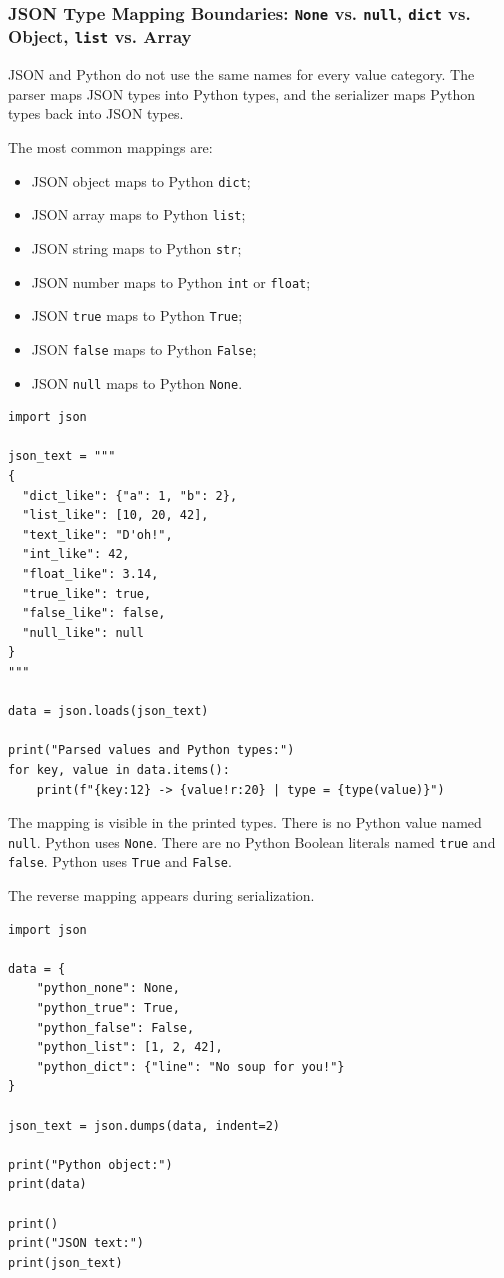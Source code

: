 \subsubsection{JSON Type Mapping Boundaries: \texttt{None} vs. \texttt{null}, \texttt{dict} vs. Object, \texttt{list} vs. Array}

JSON and Python do not use the same names for every value category. The parser maps JSON types into Python types, and the serializer maps Python types back into JSON types.

The most common mappings are:

\begin{itemize}
    \item JSON object maps to Python \texttt{dict};
    \item JSON array maps to Python \texttt{list};
    \item JSON string maps to Python \texttt{str};
    \item JSON number maps to Python \texttt{int} or \texttt{float};
    \item JSON \texttt{true} maps to Python \texttt{True};
    \item JSON \texttt{false} maps to Python \texttt{False};
    \item JSON \texttt{null} maps to Python \texttt{None}.
\end{itemize}

\begin{verbatim}
import json

json_text = """
{
  "dict_like": {"a": 1, "b": 2},
  "list_like": [10, 20, 42],
  "text_like": "D'oh!",
  "int_like": 42,
  "float_like": 3.14,
  "true_like": true,
  "false_like": false,
  "null_like": null
}
"""

data = json.loads(json_text)

print("Parsed values and Python types:")
for key, value in data.items():
    print(f"{key:12} -> {value!r:20} | type = {type(value)}")
\end{verbatim}

The mapping is visible in the printed types. There is no Python value named \texttt{null}. Python uses \texttt{None}. There are no Python Boolean literals named \texttt{true} and \texttt{false}. Python uses \texttt{True} and \texttt{False}.

The reverse mapping appears during serialization.

\begin{verbatim}
import json

data = {
    "python_none": None,
    "python_true": True,
    "python_false": False,
    "python_list": [1, 2, 42],
    "python_dict": {"line": "No soup for you!"}
}

json_text = json.dumps(data, indent=2)

print("Python object:")
print(data)

print()
print("JSON text:")
print(json_text)
\end{verbatim}

